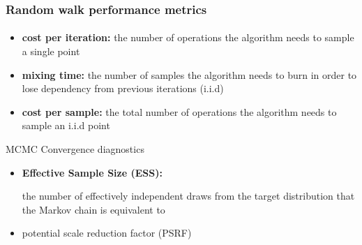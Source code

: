 \documentclass{beamer}
\begin{document}
   \begin{frame}
      \frametitle{Random walk performance metrics}
      \framesubtitle{}
      
      \begin{itemize}
         \item \textbf{cost per iteration:} the number of operations the algorithm needs to sample a single point
         \item \textbf{mixing time:} the number of samples the algorithm needs to burn in order to lose dependency from previous iterations (i.i.d)
         \item \textbf{cost per sample:} the total number of operations the algorithm needs to sample an i.i.d point

      \end{itemize}

      MCMC Convergence diagnostics

      \begin{itemize}
         \item \textbf{Effective Sample Size (ESS): } 


         the number of effectively independent draws from
         the target distribution that the Markov chain is equivalent to

         \item potential scale reduction factor (PSRF)
         
      \end{itemize}
   
   \end{frame}
   \fi
\end{document}
